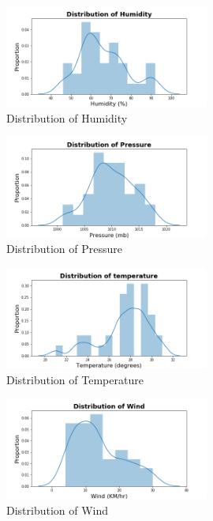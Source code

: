 \documentclass[12pt, letterpaper] {article}
\begin{document}
\begin{figure}[H]
    \centering
    \includegraphics[width=0.6\textwidth, height=0.3\textheight]{Images/distplot_humidity.png}
    \caption{Distribution of Humidity}
    \label{fig:Distribution of Humidity}
\end{figure}

\begin{figure}[H]
    \centering
    \includegraphics[width=0.6\textwidth, height=0.3\textheight]{Images/distplot_pressure.png}
    \caption{Distribution of Pressure}
    \label{fig:Distribution of Pressure}
\end{figure}

\begin{figure}[H]
    \centering
    \includegraphics[width=0.6\textwidth, height=0.3\textheight]{Images/distplot_temp.png}
    \caption{Distribution of Temperature}
    \label{fig:Distribution of Temperature}
\end{figure}

\begin{figure}[H]
    \centering
    \includegraphics[width=0.6\textwidth, height=0.3\textheight]{Images/distplot_wind.png}
    \caption{Distribution of Wind}
    \label{fig:Distribution of Wind}
\end{figure}
\end{document}
